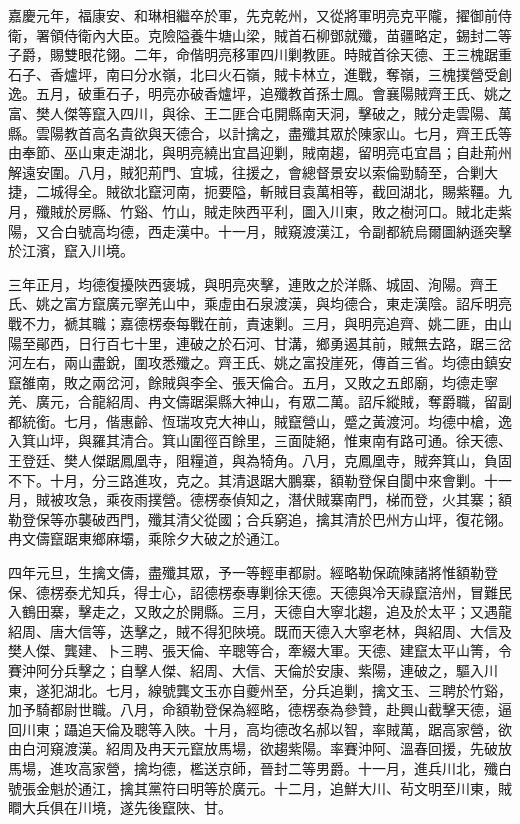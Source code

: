 \begin{pinyinscope}
嘉慶元年，福康安、和琳相繼卒於軍，先克乾州，又從將軍明亮克平隴，擢御前侍衛，署領侍衛內大臣。克險隘養牛塘山梁，賊首石柳鄧就殲，苗疆略定，錫封二等子爵，賜雙眼花翎。二年，命偕明亮移軍四川剿教匪。時賊首徐天德、王三槐踞重石子、香爐坪，南曰分水嶺，北曰火石嶺，賊卡林立，進戰，奪嶺，三槐撲營受創逸。五月，破重石子，明亮亦破香爐坪，追殲教首孫士鳳。會襄陽賊齊王氏、姚之富、樊人傑等竄入四川，與徐、王二匪合屯開縣南天洞，擊破之，賊分走雲陽、萬縣。雲陽教首高名貴欲與天德合，以計擒之，盡殲其眾於陳家山。七月，齊王氏等由奉節、巫山東走湖北，與明亮繞出宜昌迎剿，賊南趨，留明亮屯宜昌；自赴荊州解遠安圍。八月，賊犯荊門、宜城，往援之，會總督景安以索倫勁騎至，合剿大捷，二城得全。賊欲北竄河南，扼要隘，斬賊目袁萬相等，截回湖北，賜紫韁。九月，殲賊於房縣、竹谿、竹山，賊走陜西平利，圖入川東，敗之樹河口。賊北走紫陽，又合白號高均德，西走漢中。十一月，賊窺渡漢江，令副都統烏爾圖納遜突擊於江濱，竄入川境。

三年正月，均德復擾陜西褒城，與明亮夾擊，連敗之於洋縣、城固、洵陽。齊王氏、姚之富方竄廣元寧羌山中，乘虛由石泉渡漢，與均德合，東走漢陰。詔斥明亮戰不力，褫其職；嘉德楞泰每戰在前，責速剿。三月，與明亮追齊、姚二匪，由山陽至鄖西，日行百七十里，連破之於石河、甘溝，鄉勇遏其前，賊無去路，踞三岔河左右，兩山盡銳，圍攻悉殲之。齊王氏、姚之富投崖死，傳首三省。均德由鎮安竄雒南，敗之兩岔河，餘賊與李全、張天倫合。五月，又敗之五郎廟，均德走寧羌、廣元，合龍紹周、冉文儔踞渠縣大神山，有眾二萬。詔斥縱賊，奪爵職，留副都統銜。七月，偕惠齡、恆瑞攻克大神山，賊竄營山，蹙之黃渡河。均德中槍，逸入箕山坪，與羅其清合。箕山圍徑百餘里，三面陡絕，惟東南有路可通。徐天德、王登廷、樊人傑踞鳳凰寺，阻糧道，與為犄角。八月，克鳳凰寺，賊奔箕山，負固不下。十月，分三路進攻，克之。其清退踞大鵬寨，額勒登保自閬中來會剿。十一月，賊被攻急，乘夜雨撲營。德楞泰偵知之，潛伏賊寨南門，梯而登，火其寨；額勒登保等亦襲破西門，殲其清父從國；合兵窮追，擒其清於巴州方山坪，復花翎。冉文儔竄踞東鄉麻壩，乘除夕大破之於通江。

四年元旦，生擒文儔，盡殲其眾，予一等輕車都尉。經略勒保疏陳諸將惟額勒登保、德楞泰尤知兵，得士心，詔德楞泰專剿徐天德。天德與冷天祿竄涪州，冒難民入鶴田寨，擊走之，又敗之於開縣。三月，天德自大寧北趨，追及於太平；又遇龍紹周、唐大信等，迭擊之，賊不得犯陜境。既而天德入大寧老林，與紹周、大信及樊人傑、龔建、卜三聘、張天倫、辛聰等合，牽綴大軍。天德、建竄太平山箐，令賽沖阿分兵擊之；自擊人傑、紹周、大信、天倫於安康、紫陽，連破之，驅入川東，遂犯湖北。七月，線號龔文玉亦自夔州至，分兵追剿，擒文玉、三聘於竹谿，加予騎都尉世職。八月，命額勒登保為經略，德楞泰為參贊，赴興山截擊天德，逼回川東；躡追天倫及聰等入陜。十月，高均德改名郝以智，率賊萬，踞高家營，欲由白河窺渡漢。紹周及冉天元竄放馬場，欲趨紫陽。率賽沖阿、溫春回援，先破放馬場，進攻高家營，擒均德，檻送京師，晉封二等男爵。十一月，進兵川北，殲白號張金魁於通江，擒其黨符曰明等於廣元。十二月，追鮮大川、茍文明至川東，賊瞷大兵俱在川境，遂先後竄陜、甘。


\end{pinyinscope}
